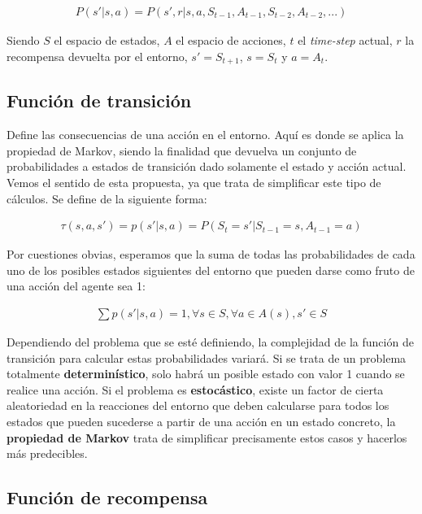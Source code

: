 \documentclass[11pt,fleqn]{book} %
\begin{document}
\begin{align*}
P(s'|s,a)=P(s',r|s,a,S_{t-1},A_{t-1},S_{t-2},A_{t-2},...)
\end{align*}

Siendo $S$ el espacio de estados, $A$ el espacio de acciones, $t$ el \textit{time-step} actual, $r$ la recompensa devuelta por el entorno, $s'=S_{t+1}$, $s=S_t$ y $a=A_t$. \\

\subsection{Función de transición}

Define las consecuencias de una acción en el entorno. Aquí es donde se aplica la propiedad de Markov, siendo la finalidad que devuelva un conjunto de probabilidades a estados de transición dado solamente el estado y acción actual. Vemos el sentido de esta propuesta, ya que trata de simplificar este tipo de cálculos. Se define de la siguiente forma:

\begin{align*}
\tau(s,a,s')=p(s'|s,a)=P(S_t=s'|S_{t-1}=s,A_{t-1}=a)
\end{align*}

Por cuestiones obvias, esperamos que la suma de todas las probabilidades de cada uno de los posibles estados siguientes del entorno que pueden darse como fruto de una acción del agente sea 1:

\begin{align*}
\sum{p(s'|s,a)=1, \forall s \in S, \forall a \in A(s), s' \in S}
\end{align*}

Dependiendo del problema que se esté definiendo, la complejidad de la función de transición para calcular estas probabilidades variará. Si se trata de un problema totalmente \textbf{determinístico}, solo habrá un posible estado con valor 1 cuando se realice una acción. Si el problema es \textbf{estocástico}, existe un factor de cierta aleatoriedad en la reacciones del entorno que deben calcularse para todos los estados que pueden sucederse a partir de una acción en un estado concreto, la \textbf{propiedad de Markov} trata de simplificar precisamente estos casos y hacerlos más predecibles. \\

\subsection{Función de recompensa}
\end{document}
